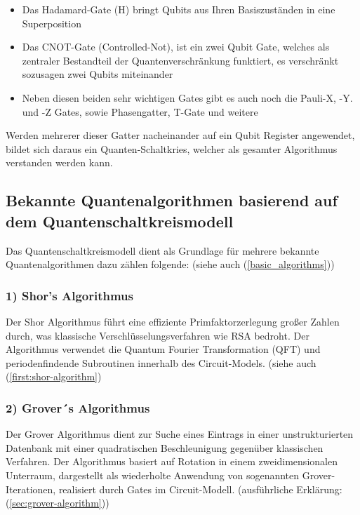 \begin{itemize}
    \item Das Hadamard-Gate (H) bringt Qubits aus Ihren Basiszuständen in eine Superposition 
    \item Das CNOT-Gate (Controlled-Not), ist ein zwei Qubit Gate, welches als zentraler Bestandteil der Quantenverschränkung funktiert, es verschränkt sozusagen zwei Qubits miteinander 
    \item Neben diesen beiden sehr wichtigen Gates gibt es auch noch die Pauli-X, -Y. und -Z Gates, sowie Phasengatter, T-Gate  und weitere 
\end{itemize}
Werden mehrerer dieser Gatter nacheinander auf ein Qubit Register angewendet, bildet sich daraus ein Quanten-Schaltkries, welcher als gesamter Algorithmus verstanden werden kann.
\subsection*{Bekannte Quantenalgorithmen basierend auf dem Quantenschaltkreismodell}
Das Quantenschaltkreismodell dient als Grundlage für mehrere bekannte Quantenalgorithmen dazu zählen folgende: (siehe auch (\autoref{basic_algorithms}))
\subsubsection*{1) Shor's Algorithmus}
Der Shor Algorithmus führt eine effiziente Primfaktorzerlegung großer Zahlen durch, was klassische Verschlüsselungsverfahren wie RSA bedroht. Der Algorithmus verwendet die Quantum Fourier Transformation (QFT) und periodenfindende Subroutinen innerhalb des Circuit-Models. (siehe auch (\autoref{first:shor-algorithm})
\subsubsection*{2) Grover´s Algorithmus}
Der Grover Algorithmus dient zur Suche eines Eintrags in einer unstrukturierten Datenbank mit einer quadratischen Beschleunigung gegenüber klassischen Verfahren.
Der Algorithmus basiert auf Rotation in einem zweidimensionalen Unterraum, dargestellt als wiederholte Anwendung von sogenannten Grover-Iterationen, realisiert durch Gates im Circuit-Modell. (ausführliche Erklärung: (\autoref{sec:grover-algorithm})) 

